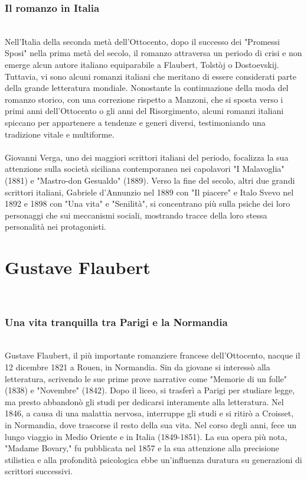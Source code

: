 \documentclass{report}
\begin{document}
\subsubsection{Il romanzo in Italia}
\\
Nell'Italia della seconda metà dell'Ottocento, dopo il successo dei "Promessi Sposi" nella prima metà del secolo, il romanzo attraversa un periodo di crisi e non emerge alcun autore italiano equiparabile a Flaubert, Tolstòj o Dostoevskij. Tuttavia, vi sono alcuni romanzi italiani che meritano di essere considerati parte della grande letteratura mondiale. Nonostante la continuazione della moda del romanzo storico, con una correzione rispetto a Manzoni, che si sposta verso i primi anni dell'Ottocento o gli anni del Risorgimento, alcuni romanzi italiani spiccano per appartenere a tendenze e generi diversi, testimoniando una tradizione vitale e multiforme.
\\
\\
Giovanni Verga, uno dei maggiori scrittori italiani del periodo, focalizza la sua attenzione sulla società siciliana contemporanea nei capolavori "I Malavoglia" (1881) e "Mastro-don Gesualdo" (1889). Verso la fine del secolo, altri due grandi scrittori italiani, Gabriele d'Annunzio nel 1889 con "Il piacere" e Italo Svevo nel 1892 e 1898 con "Una vita" e "Senilità", si concentrano più sulla psiche dei loro personaggi che sui meccanismi sociali, mostrando tracce della loro stessa personalità nei protagonisti.
\\
\section{Gustave Flaubert}
\\
\subsubsection{Una  vita  tranquilla  tra  Parigi  e  la  Normandia}
\\
Gustave Flaubert, il più importante romanziere francese dell'Ottocento, nacque il 12 dicembre 1821 a Rouen, in Normandia. Sin da giovane si interessò alla letteratura, scrivendo le sue prime prove narrative come "Memorie di un folle" (1838) e "Novembre" (1842). Dopo il liceo, si trasferì a Parigi per studiare legge, ma presto abbandonò gli studi per dedicarsi interamente alla letteratura. Nel 1846, a causa di una malattia nervosa, interruppe gli studi e si ritirò a Croisset, in Normandia, dove trascorse il resto della sua vita. Nel corso degli anni, fece un lungo viaggio in Medio Oriente e in Italia (1849-1851). La sua opera più nota, "Madame Bovary," fu pubblicata nel 1857 e la sua attenzione alla precisione stilistica e alla profondità psicologica ebbe un'influenza duratura su generazioni di scrittori successivi.
\\
\end{document}
